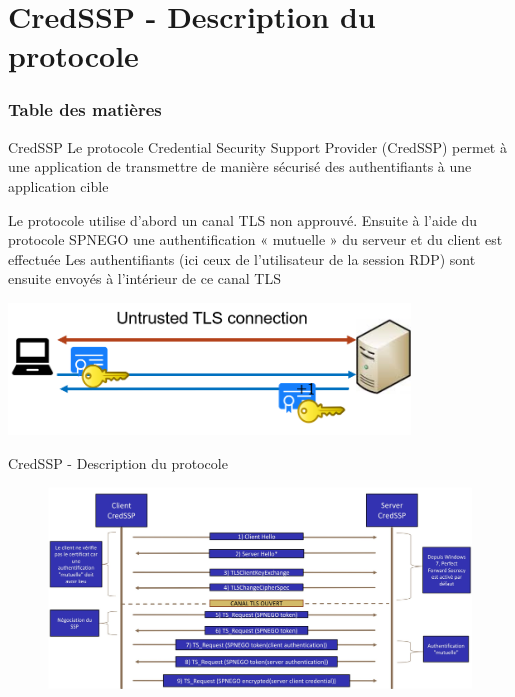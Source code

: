 \documentclass{beamer}
\begin{document}
\section{CredSSP - Description du protocole}


\begin{frame}
	\frametitle{Table des matières}
	\tableofcontents[currentsection]
\end{frame}


\begin{frame}{CredSSP}
Le protocole Credential Security Support Provider (CredSSP) permet à une application de transmettre de manière sécurisé des authentifiants à une application cible
\newline

Le protocole utilise d'abord un canal TLS non approuvé. Ensuite  à l'aide du protocole SPNEGO  une authentification « mutuelle » du serveur et du client est effectuée
Les authentifiants (ici ceux de l'utilisateur de la session RDP) sont ensuite envoyés à l'intérieur de ce canal TLS
\newline
\begin{center}
\includegraphics[width=0.8\textwidth,height=0.3\textheight]{credssp.png}
\end{center}
\end{frame}

\begin{frame}{CredSSP - Description du protocole}
\begin{figure}
\includegraphics[scale=0.16]{graph.jpg}
\end{figure}
\end{frame}
\end{document}
